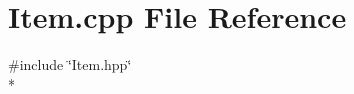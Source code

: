 \section{Item.\-cpp File Reference}
\label{_item_8cpp}
{\ttfamily \#include \char`\"{}Item.\-hpp\char`\"{}}\\*
